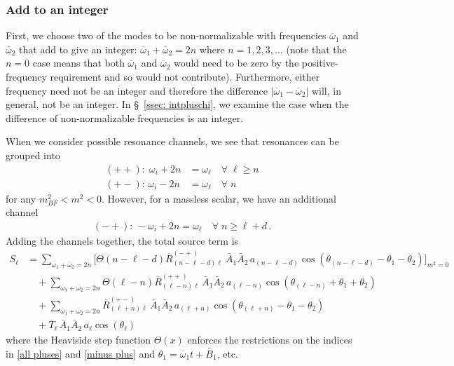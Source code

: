 \documentclass[letterpaper,11pt]{article}
\newcommand{\oone}{\overline{\omega}_1}
\newcommand{\otwo}{\overline{\omega}_2}
\begin{document}
\subsubsection{Add to an integer}
\label{ssec: add to integer}

First, we choose two of the modes to be non-normalizable with frequencies $\oone$ and $\otwo$ that add to give an integer: $\oone+ \otwo = 2n$ where $n = 1, 2, 3, \ldots$ (note that the $n = 0$ case means that both $\oone$ and $\otwo$ would need to be zero by the positive-frequency requirement and so would not contribute). Furthermore, either frequency need not be an integer and therefore the difference $|\oone - \otwo|$ will, in general, not be an integer. In \S\!~\ref{ssec: intpluschi}, we examine the case when the difference of non-normalizable frequencies is an integer.

When we consider possible resonance channels, we see that resonances can be grouped into
\begin{align}
\label{all pluses}
(++): \; \omega_i + 2n &= \omega_\ell \quad \forall \; \ell \geq n \\
(+-): \, \omega_i - 2n &=\omega_\ell \quad \forall \; n
\end{align}
for any $m^2_{BF} < m^2 < 0$. However, for a massless scalar, we have an additional channel
\begin{align}
\label{minus plus}
(-+): \, -\omega_i + 2n = \omega_\ell \quad \forall \; n \geq \ell + d \, .
\end{align}
Adding the channels together, the total source term is
\begin{align}
\label{add to integer}
S_\ell &=  \!\!\!\! \sum_{\oone + \otwo = 2n}\bigg[ \Theta\left( n - \ell - d \right) \overline{R}^{(-+)}_{(n - \ell - d) \ell} \ \bar A_1 \bar A_2 \, a_{(n - \ell - d)} \cos \left( \theta_{(n - \ell - d)} - \theta_1 - \theta_2 \right) \bigg]_{m^2 = 0}  \nonumber \\ 
%
&  \quad + \!\!\!\! \sum_{\oone + \otwo = 2n} \!\!\!\! \Theta \left( \ell - n \right)  \overline{R}^{(++)}_{(\ell - n)\ell} \, \bar A_1 \bar A_2 \, a_{(\ell - n)} \cos \left( \theta_{(\ell - n)} + \theta_1 + \theta_2 \right) \nonumber \\
%
& \quad  + \!\!\!\! \sum_{\oone + \otwo = 2n} \!\!\!\! \overline{R}^{(+-)}_{(\ell + n) \ell} \, \bar A_1 \bar A_2 \, a_{(\ell + n)} \cos\left( \theta_{(\ell + n)} - \theta_1 - \theta_2 \right) \nonumber \\
%
& \quad + \overline{T}_{\ell} \, \bar A_1 \bar A_2 \, a_\ell \cos \left( \theta_\ell \right)
\end{align}
where the Heaviside step function $\Theta(x)$ enforces the restrictions on the indices in \eqref{all pluses} and \eqref{minus plus} and $\theta_1 = \oone t + \bar B_1$, etc. 
\end{document}
